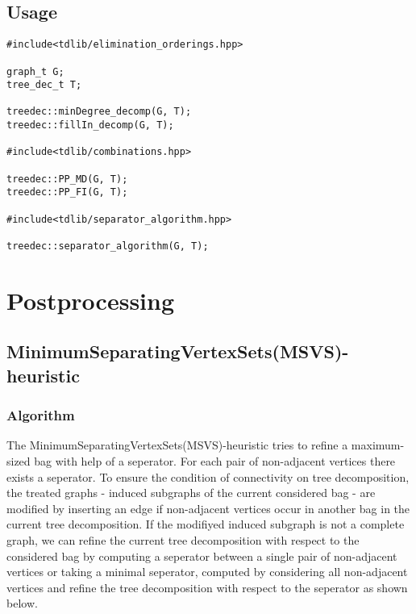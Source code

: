 \documentclass[a4wide]{article}
\begin{document}
\subsection{Usage}

\begin{lstlisting}[mathescape]
#include<tdlib/elimination_orderings.hpp>

graph_t G;
tree_dec_t T;

treedec::minDegree_decomp(G, T);
treedec::fillIn_decomp(G, T);

#include<tdlib/combinations.hpp>

treedec::PP_MD(G, T);
treedec::PP_FI(G, T);

#include<tdlib/separator_algorithm.hpp>

treedec::separator_algorithm(G, T);
\end{lstlisting}

\newpage

\section{Postprocessing}

\subsection{MinimumSeparatingVertexSets(MSVS)-heuristic}

\subsubsection{Algorithm}

The MinimumSeparatingVertexSets(MSVS)-heuristic \cite{B_tc1, Koster_thesis} tries to refine a maximum-sized bag with help of a seperator. For each pair of non-adjacent vertices there exists a seperator. To ensure the condition of connectivity on tree decomposition, the treated graphs - induced subgraphs of the current considered bag - are modified by inserting an edge if non-adjacent vertices occur in another bag in the current tree decomposition. If the modifiyed induced subgraph is not a complete graph, we can refine the current tree decomposition with respect to the considered bag by computing a seperator between a single pair of non-adjacent vertices or taking a minimal seperator, computed by considering all non-adjacent vertices and refine the tree decomposition with respect to the seperator as shown below.
\end{document}
